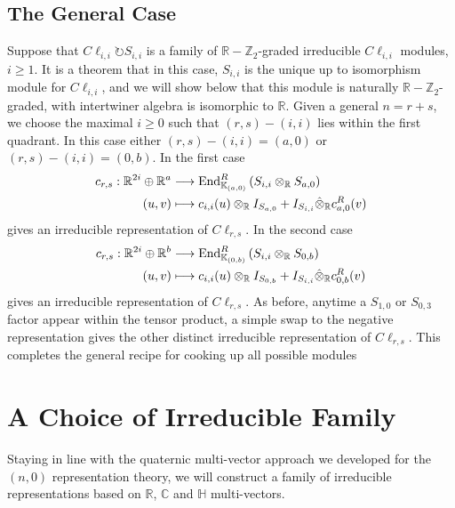 \documentclass[openany, 11pt]{article}
\theoremstyle{definition}
\theoremstyle{remark}
\def\lp{\ensuremath{\left(}}
\def\rp{\ensuremath{\right)}}
\def\bC{\ensuremath{\mathbb{C}}}
\def\bH{\ensuremath{\mathbb{H}}}
\def\bR{\ensuremath{\mathbb{R}}}
\def\bZ{\ensuremath{\mathbb{Z}}}
\def\bK{\ensuremath{\mathbb{K}}}
\def\End{\ensuremath{\textnormal{End}}}
\begin{document}
\subsection*{The General Case}
Suppose that $C\ell_{i,i}\circlearrowright S_{i,i}$ is a family of $\bR-\bZ_2$-graded irreducible $C\ell_{i,i}$ modules, $i\geq 1$. It is a theorem that in this case, $S_{i,i}$ is the unique up to isomorphism module for $C\ell_{i,i}$, and we will show below that this module is naturally $\bR-\bZ_2$-graded, with intertwiner algebra is isomorphic to $\bR$. Given a general $n=r+s$, we choose the maximal $i\geq 0$ such that $(r,s)-(i,i)$ lies within the first quadrant. In this case either $(r,s)-(i,i)=(a,0)$ or $(r,s)-(i,i)=(0,b)$. In the first case
\begin{align*}
    c_{r,s}:\bR^{2i}\oplus\bR^a&\longrightarrow \End^R_{\bK_{(a,0)}}\lp S_{i,i}\otimes_{\bR} S_{a,0}\rp\\
    (u,v)&\longmapsto c_{i,i}(u)\otimes_{\bR}I_{S_{a,0}}+I_{S_{i,i}}\hat{\otimes}_{\bR}c^R_{a,0}(v)
\end{align*}
gives an irreducible representation of $C\ell_{r,s}$.
In the second case
\begin{align*}
    c_{r,s}:\bR^{2i}\oplus\bR^b&\longrightarrow \End^R_{\bK_{(0,b)}}\lp S_{i,i}\otimes_{\bR} S_{0,b}\rp\\
    (u,v)&\longmapsto c_{i,i}(u)\otimes_{\bR}I_{S_{0,b}}+I_{S_{i,i}}\hat{\otimes}_{\bR}c^R_{0,b}(v)
\end{align*}
gives an irreducible representation of $C\ell_{r,s}$. As before, anytime a $S_{1,0}$ or $S_{0,3}$ factor appear within the tensor product, a simple swap to the negative representation gives the other distinct irreducible representation of $C\ell_{r,s}$. This completes the general recipe for cooking up all possible modules 
\section{A Choice of Irreducible Family}
Staying in line with the quaternic multi-vector approach we developed for the $(n,0)$ representation theory, we will construct a family of irreducible representations based on $\bR$, $\bC$ and $\bH$ multi-vectors. 
\end{document}
